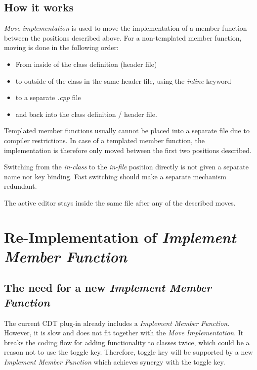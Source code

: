 \subsection{How it works}

\textit{Move implementation} is used to move the implementation of a member
function between the positions described above. For a non-templated member
function, moving is done in the following order:

\begin{itemize}
 \item From inside of the class definition (header file)
 \item to outside of the class in the same header file, using the
\textit{inline} keyword
 \item to a separate \textit{.cpp} file
 \item and back into the class definition / header file.
\end{itemize}

Templated member functions  usually cannot be placed into
a separate file due to compiler restrictions. In case of a templated member
function, the implementation is therefore only moved between the first two
positions described.

Switching from the \textit{in-class} to the \textit{in-file} position directly
is not given a separate name nor key binding. Fast switching should make a
separate mechanism redundant. 

The active editor  stays inside the same file after any of
the described moves.

\section{Re-Implementation of \textit{Implement Member Function}}

\subsection{The need for a new \textit{Implement Member Function}}

The current CDT plug-in already includes a \textit{Implement Member Function}.
However, it is slow and does not fit together with the \textit{Move
Implementation}. It breaks the coding flow for adding functionality to classes
twice, which could be a reason not to use the toggle key. Therefore, toggle key
will be supported by a new \textit{Implement Member Function} which achieves
synergy with the toggle key.

